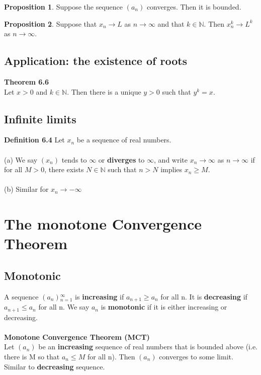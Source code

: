 \documentclass{article}
\theoremstyle{definition}
\newtheorem{proposition}{Proposition}[definition]
\theoremstyle{definition}
\theoremstyle{remark}
\begin{document}
\begin{proposition}
    Suppose the sequence $(a_{n})$ converges. Then it is bounded.
\end{proposition}

\begin{proposition}
    Suppose that $x_{n} \rightarrow L$ as $n \rightarrow \infty$ and that $k \in \mathbb{N}$. Then $x{_{n}^{k}} \rightarrow L^{k}$ as $n \rightarrow \infty$.\\
\end{proposition}

\subsection {Application: the existence of roots}
\textbf{Theorem 6.6}\\
Let $x>0$ and $k \in \mathbb{N}$. Then there is a unique $y>0$ such that $y^{k}=x$.\\

\subsection {Infinite limits}
\textbf{Definition 6.4}
Let ${x_{n}}$ be a sequence of real numbers.\\
\\
(a) We say $(x_{n})$ tends to $\infty$ or \textbf{diverges} to $\infty$, and write $x_{n}\rightarrow \infty$ as $n \rightarrow \infty$ if for all $M > 0$, there exists $N \in \mathbb{N}$ such that $n>N$ implies $x_{n}\geq M$.\\
\\
(b) Similar for $x_{n} \rightarrow -\infty$
\pagebreak


\section{The monotone Convergence Theorem}
\subsection{Monotonic}
A sequence $(a_{n}){_{n=1}^{\infty}}$ is \textbf{increasing} if $a_{n+1} \geq a_{n} $ for all n. It is \textbf{decreasing} if $a_{n+1}\leq a_{n}$ for all n. We say ${a_n}$ is \textbf{monotonic} if it is either increasing or decreasing. \\
\\
\textbf{Monotone Convergence Theorem (MCT)}\\
Let $(a_{n})$ be an \textbf{increasing} sequence of real numbers that is bounded above (i.e. there is M so that $a_{n}\leq M$ for all n). Then $(a_{n})$ converges to some limit.\\
Similar to \textbf{decreasing} sequence. \\
\end{document}
